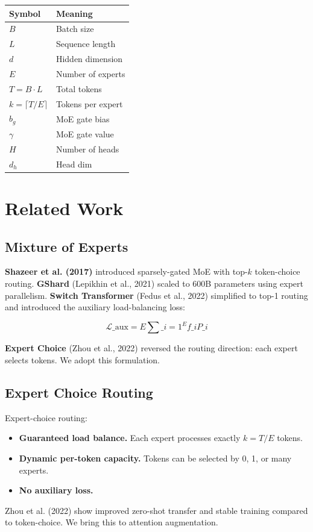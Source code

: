 \begin{table}[H]
\centering
\small
\begin{tabular}{ll}
\toprule
\textbf{Symbol} & \textbf{Meaning} \\
\midrule
$B$ & Batch size \\
$L$ & Sequence length \\
$d$ & Hidden dimension \\
$E$ & Number of experts \\
$T = B \cdot L$ & Total tokens \\
$k = \lceil T / E \rceil$ & Tokens per expert \\
$b_g$ & MoE gate bias \\
$\gamma$ & MoE gate value \\
$H$ & Number of heads \\
$d_h$ & Head dim \\
\bottomrule
\end{tabular}
\end{table}



\section{Related Work}

\subsection{Mixture of Experts}

\textbf{Shazeer et al. (2017)} introduced sparsely-gated MoE with top-$k$ 
token-choice routing. \textbf{GShard} (Lepikhin et al., 2021) scaled to 600B 
parameters using expert parallelism. \textbf{Switch Transformer} (Fedus et al., 
2022) simplified to top-1 routing and introduced the auxiliary 
load-balancing loss:

\[
\mathcal{L}\_\text{aux} = E \sum\_{i=1}^{E} f\_i P\_i
\tag{2.1}
\]

\textbf{Expert Choice} (Zhou et al., 2022) reversed the routing direction:
each expert selects tokens. We adopt this formulation.

\subsection{Expert Choice Routing}

Expert-choice routing:

\begin{itemize}
\item \textbf{Guaranteed load balance.} Each expert processes exactly $k = T / E$
  tokens.
\item \textbf{Dynamic per-token capacity.} Tokens can be selected by 0, 1, or many
  experts.
\item \textbf{No auxiliary loss.}

\end{itemize}
Zhou et al. (2022) show improved zero-shot transfer and stable training 
compared to token-choice. We bring this to attention augmentation.

